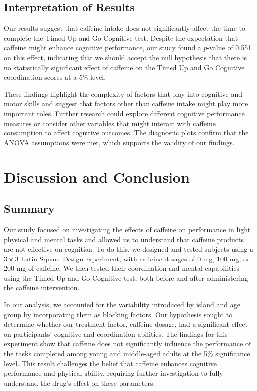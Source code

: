 \documentclass[11pt,a4paper,twoside]{tau-book}
\begin{document}
\subsection{Interpretation of Results}
Our results suggest that caffeine intake does not significantly affect the time to complete the Timed Up and Go Cognitive test. Despite the expectation that caffeine might enhance cognitive performance, our study found a $p$-value of 0.551 on this effect, indicating that we should accept the null hypothesis that there is no statistically significant effect of caffeine on the Timed Up and Go Cognitive coordination scores at a 5\% level. 

These findings highlight the complexity of factors that play into cognitive and motor skills and suggest that factors other than caffeine intake might play more important roles. Further research could explore different cognitive performance measures or consider other variables that might interact with caffeine consumption to affect cognitive outcomes. The diagnostic plots confirm that the ANOVA assumptions were met, which supports the validity of our findings.

\section{Discussion and Conclusion}
\subsection{Summary}
Our study focused on investigating the effects of caffeine on performance in light physical and mental tasks and allowed us to understand that caffeine products are not effective on cognition. To do this, we designed and tested subjects using a $3\times3$ Latin Square Design experiment, with caffeine dosages of 0 mg, 100 mg, or 200 mg of caffeine. We then tested their coordination and mental capabilities using the Timed Up and Go Cognitive test, both before and after administering the caffeine intervention.

In our analysis, we accounted for the variability introduced by island and age group by incorporating them as blocking factors. Our hypothesis sought to determine whether our treatment factor, caffeine dosage, had a significant effect on participants’ cognitive and coordination abilities. The findings for this experiment show that caffeine does not significantly influence the performance of the tasks completed among young and middle-aged adults at the 5\% significance level. This result challenges the belief that caffeine enhances cognitive performance and physical ability, requiring further investigation to fully understand the drug's effect on these parameters.
\end{document}
